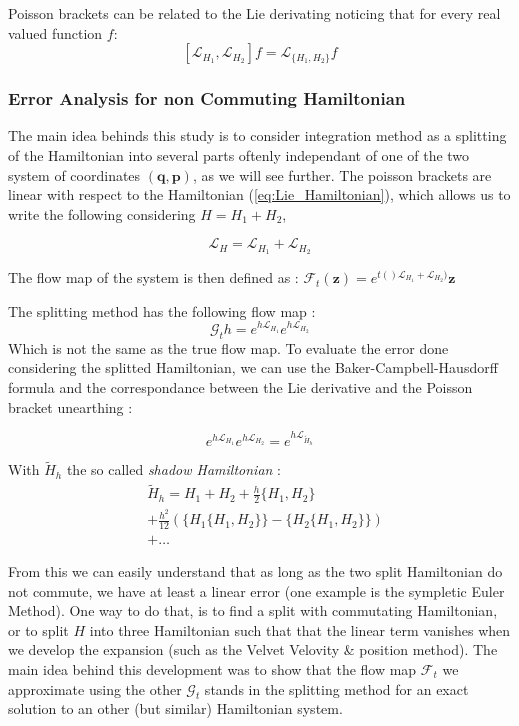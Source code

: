 \documentclass[ansiapaper]{report}
\begin{document}
\begin{multicols}{3}
	Poisson brackets can be related to the Lie derivating noticing that for every real valued function $f$: $$[\mathcal{L}_{H_1}, \mathcal{L}_{H_2}]f = \mathcal{L}_{\{H_1, H_2\}}f$$

	\subsubsection{Error Analysis for non Commuting Hamiltonian}
    The main idea behinds this study is to consider integration method as a splitting of the Hamiltonian into several parts oftenly independant of one of the two system of coordinates $(\textbf{q}, \textbf{p})$, as we will see further. The poisson brackets are linear with respect to the Hamiltonian (\ref{eq:Lie_Hamiltonian}), which allows us to write the following considering $H = H_1 + H_2$,

	$$\mathcal{L}_H = \mathcal{L}_{H_1} + \mathcal{L}_{H_2}$$

	The flow map of the system is then defined as : $\mathcal{F}_t(\textbf{z}) = e^{t()\mathcal{L}_{H_1} + \mathcal{L}_{H_2})}\textbf{z}  $

	The splitting method has the following flow map : $$\mathcal{G}_th= e^{h\mathcal{L}_{H_1}}e^{h\mathcal{L}_{H_2}}$$ Which is not the same as the true flow map. To evaluate the error done considering the splitted Hamiltonian, we can use the Baker-Campbell-Hausdorff formula and the correspondance between the Lie derivative and the Poisson bracket unearthing :

	$$ e^{h\mathcal{L}_{H_1}}e^{h\mathcal{L}_{H_2}} = e^{ h \mathcal{L}_{\tilde{H}_h}}$$

    With $\tilde{H}_h$ the so called \textit{shadow Hamiltonian} \cite{MD_theo} :
    \begin{equation}
	\begin{split}
        &\tilde{H}_h = H_1 + H_2 + \frac{h}{2}\{H_1 , H_2 \} \\ 
        &+ \frac{h^2}{12}(\{H_1 \{H_1 , H_2\} \} - \{H_2 \{H_1 , H_2 \} \}) \\
        &+ \dots
	\end{split}
    \label{eq:shadow_H}
    \end{equation}

	From this we can easily understand that as long as the two split Hamiltonian do not commute, we have at least a linear error (one example is the sympletic Euler Method). One way to do that, is to find a split with commutating Hamiltonian, or to split $H$ into three Hamiltonian such that that the linear term vanishes when we develop the expansion (such as the Velvet Velovity \& position method). The main idea behind this  development was to show that the flow map $\mathcal{F}_t$ we approximate using the other $\mathcal{G}_t$ stands in the splitting method for an exact solution to an other (but similar) Hamiltonian system.


\end{multicols}
\end{document}

